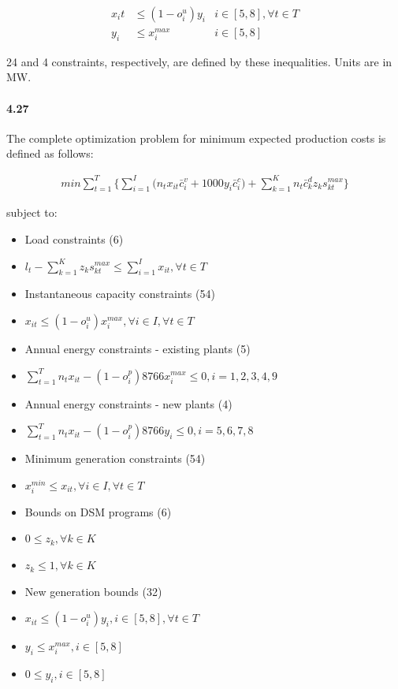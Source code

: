 \documentclass{article}
\begin{document}
	\begin{align*}
		x_it &\leq (1-o_i^u) y_i &i \in [5, 8], \forall t \in T \\
		y_i &\leq x_i^{max} &i \in [5, 8]
	\end{align*}
	
	24 and 4 constraints, respectively, are defined by these inequalities. Units are in MW.
	
	
\paragraph{4.27}
	The complete optimization problem for minimum expected production costs is defined as follows:
	
	\begin{align*}
		min \sum_{t=1}^{T} \bigg\{ 
		\sum_{i=1}^{I} \big( n_t x_{it} \bar{c}_i^v + 1000y_i \bar{c}_i^c \big)
		+ \sum_{k=1}^{K}  n_t \bar{c}_k^d z_k s_{kt}^{max} 
		\bigg\}
	\end{align*}
	
	subject to:
	\begin{itemize}
		\item Load constraints (6)
		\item[] $l_t - \sum_{k=1}^{K} z_k s_{kt}^{max} \leq \sum_{i=1}^{I} x_{it}, \forall t \in T$
		\item Instantaneous capacity constraints (54)
		\item[] $x_{it} \leq (1 - o_i^u) x_i^{max}, \forall i \in I, \forall t \in T$
		\item Annual energy constraints - existing plants (5)
		\item[] $\sum_{t=1}^T n_t x_{it} - (1-o_i^p) 8766 x_i^{max} \leq 0, i = 1, 2, 3, 4, 9$
		\item Annual energy constraints - new plants (4)
		\item[] $\sum_{t=1}^T n_t x_{it} - (1-o_i^p) 8766 y_i \leq 0, i = 5, 6, 7, 8$
		\item Minimum generation constraints (54)
		\item[] $x_i^{min} \leq x_{it}, \forall i \in I, \forall t \in T$
		\item Bounds on DSM programs (6)
		\item[] $0 \leq z_k, \forall k \in K$
		\item[] $z_k \leq 1, \forall k \in K$
		\item New generation bounds (32)
		\item[] $x_{it} \leq (1-o_i^u) y_i, i \in [5, 8], \forall t \in T$
		\item[] $y_i \leq x_i^{max}, i \in [5, 8]$
		\item[] $0 \leq y_i, i \in [5,8]$
	\end{itemize}
	
\end{document}
